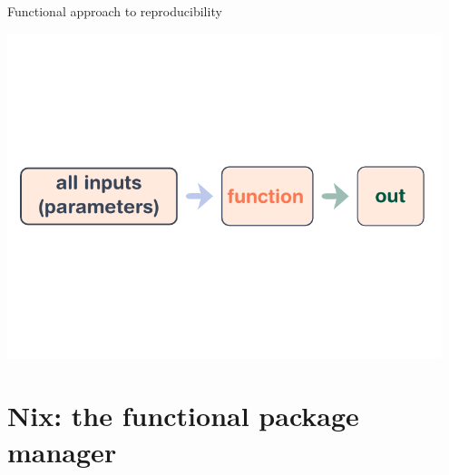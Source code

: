 \documentclass[t, aspectratio=169]{beamer}
\begin{document}
\begin{frame}{Functional approach to reproducibility}
    \begin{center}
        \includegraphics[width=0.95\textwidth]{img/schema-build-functional-correct.pdf}
    \end{center}
\end{frame}

\section{Nix: the functional package manager}
\end{document}
